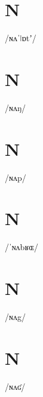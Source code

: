 \documentclass[10pt,a4paper,twoside]{book}
\begin{document}
\section*{N}

\begin{multicols}{3}
 {/ɴʌˈǀɒtʼ/} {}
\end{multicols}

\section*{N}

\begin{multicols}{3}
 {/ɴʌŋ/} {}
\end{multicols}

\section*{N}

\begin{multicols}{3}
 {/ɴʌp/} {}
\end{multicols}

\section*{N}

\begin{multicols}{3}
 {/ˈɴʌbʁɶ/} {}
\end{multicols}

\section*{N}

\begin{multicols}{3}
 {/ɴʌg/} {}
\end{multicols}

\section*{N}

\begin{multicols}{3}
 {/ɴʌʛ/} {}
\end{multicols}
\end{document}
